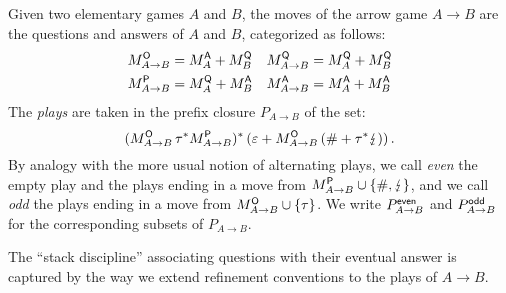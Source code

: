 \begin{definition} %
Given two elementary games $A$ and $B$,
the moves of the arrow game $A \rightarrow B$
are the questions and answers of $A$ and $B$,
categorized as follows:
\begin{align*}
  M_{A \rightarrow B}^{ \mathsf{O} } &= M_A^{ \mathsf{A} } + M_B^{ \mathsf{Q} } &
  M_{A \rightarrow B}^{ \mathsf{Q} } &= M_A^{ \mathsf{Q} } + M_B^{ \mathsf{Q} } \\
  M_{A \rightarrow B}^{ \mathsf{P} } &= M_A^{ \mathsf{Q} } + M_B^{ \mathsf{A} } &
  M_{A \rightarrow B}^{ \mathsf{A} } &= M_A^{ \mathsf{A} } + M_B^{ \mathsf{A} }
\end{align*}
The \emph{plays} are taken in
the prefix closure $P_{A \rightarrow B}$ of the set:
\[
    (M_{A \rightarrow B}^{ \mathsf{O} } \, \tau^*
     M_{A \rightarrow B}^{ \mathsf{P} })^* \,
    (\varepsilon + M_{A \rightarrow B}^{ \mathsf{O} } \, (\# + \tau^*\lightning)) \,.
\]
By analogy with the more usual notion of alternating plays,
we call \emph{even}
the empty play and the plays ending in
a move from $M_{A \rightarrow B}^{ \mathsf{P} } \cup \{\#, \lightning\}$, and
we call \emph{odd} the plays ending in
a move from $M_{A \rightarrow B}^{ \mathsf{O} } \cup \{\tau\}$.
We write $P_{A \rightarrow B}^{ \mathsf{even} }$ and $P_{A \rightarrow B}^{ \mathsf{odd} }$
for the corresponding subsets of $P_{A \rightarrow B}$.
\end{definition}

The ``stack discipline'' associating questions
with their eventual answer is captured by
the way we extend refinement conventions to
the plays of $A \rightarrow B$.

